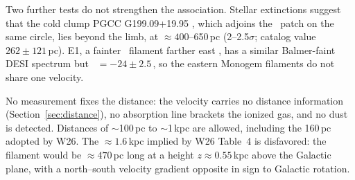Two further tests do not strengthen the association. Stellar extinctions \citep{Anders2022,Gaia2023} suggest that the cold clump PGCC G199.09+19.95 \citep{Planck2016}, which adjoins the \Ha\ patch on the same circle, lies beyond the limb, at $\approx400$--650\,pc (2--2.5$\sigma$; catalog value $262\pm121$\,pc). E1, a fainter \Oiii\ filament farther east \citep{Fesen2026}, has a similar Balmer-faint DESI spectrum but \vlsr\ $=-24\pm2.5$\,\kms, so the eastern Monogem filaments do not share one velocity.

No measurement fixes the distance: the velocity carries no distance information (Section~\ref{sec:distance}), no absorption line brackets the ionized gas, and no dust is detected. Distances of $\sim$100\,pc to $\sim$1\,kpc are allowed, including the 160\,pc adopted by W26. The $\approx1.6$\,kpc implied by W26 Table~4 is disfavored: the filament would be $\approx470$\,pc long at a height $z\approx0.55$\,kpc above the Galactic plane, with a north--south velocity gradient opposite in sign to Galactic rotation.
